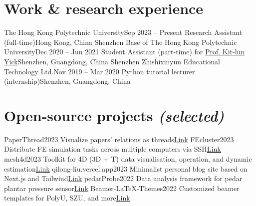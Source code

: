 \documentclass[letterpaper,11pt]{article}
\begin{document}
    \section{Work \& research experience}

    \resumeSubHeadingListStart
        \resumeSubheading
            {The Hong Kong Polytechnic University}{Sep 2023 -- Present}
            {Research Assistant (full-time)}{Hong Kong, China}
        \resumeSubheading
            {Shenzhen Base of The Hong Kong Polytechnic University}{Dec 2020 -- Jun 2021}
            {Student Assistant (part-time) for \href{https://research.polyu.edu.hk/en/persons/kit-lun-yick}{Prof. Kit-lun Yick}}{Shenzhen, Guangdong, China}
        \resumeSubheading
            {Shenzhen Zhishixinyun Educational Technology Ltd.}{Nov 2019 -- Mar 2020}
            {Python tutorial lecturer (internship)}{Shenzhen, Guangdong, China}
    \resumeSubHeadingListEnd

    \section{Open-source projects \emph{(selected)}}

    \resumeSubHeadingListStart
        \resumeSubheading
            {PaperThread}{2023}
            {Visualize papers' relations as threads}{\href{https://github.com/liu-qilong/obsidian-setup}{\underline{Link}}}
        \resumeSubheading
            {FEcluster}{2023}
            {Distribute FE simulation tasks across multiple computers via SSH}{\href{https://github.com/liu-qilong/FEcluster}{\underline{Link}}}
        \resumeSubheading
            {mesh4d}{2023}
            {Toolkit for 4D (3D + T) data visualisation, operation, and dynamic estimation}{\href{https://github.com/liu-qilong/mesh4d}{\underline{Link}}}
        \resumeSubheading
            {qilong-liu.vercel.app}{2023}
            {Minimalist personal blog site based on Next.js and Tailwind}{\href{https://github.com/liu-qilong/qilong-liu}{\underline{Link}}}
        \resumeSubheading
            {pedarProbe}{2022}
            {Data analysis framework for pedar plantar pressure sensor}{\href{https://github.com/liu-qilong/pedarProbe}{\underline{Link}}}
        \resumeSubheading
            {Beamer-LaTeX-Themes}{2022}
            {Customized beamer templates for PolyU, SZU, and more}{\href{https://github.com/liu-qilong/Beamer-LaTeX-Themes}{\underline{Link}}}
    \resumeSubHeadingListEnd
\end{document}
